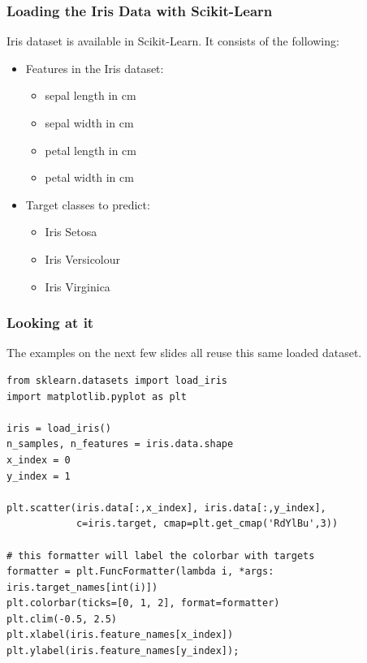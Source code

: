%
\begin{frame}[fragile]\frametitle{Loading the Iris Data with Scikit-Learn}
Iris dataset is available in Scikit-Learn.
It consists of the following:
\begin{itemize}
\item Features in the Iris dataset:
	\begin{itemize}
	\item sepal length in cm
	\item     sepal width in cm
	\item     petal length in cm
	\item     petal width in cm
	\end{itemize}
\item Target classes to predict:
	\begin{itemize}
	\item Iris Setosa
	\item     Iris Versicolour
	\item     Iris Virginica
	\end{itemize}
\end{itemize}
\end{frame}
%
\begin{frame}[fragile]\frametitle{Looking at it}
The examples on the next few slides all reuse this same loaded dataset.
\begin{lstlisting}
from sklearn.datasets import load_iris
import matplotlib.pyplot as plt

iris = load_iris()
n_samples, n_features = iris.data.shape
x_index = 0
y_index = 1

plt.scatter(iris.data[:,x_index], iris.data[:,y_index],
            c=iris.target, cmap=plt.get_cmap('RdYlBu',3))

# this formatter will label the colorbar with targets
formatter = plt.FuncFormatter(lambda i, *args: iris.target_names[int(i)])
plt.colorbar(ticks=[0, 1, 2], format=formatter)
plt.clim(-0.5, 2.5)
plt.xlabel(iris.feature_names[x_index])
plt.ylabel(iris.feature_names[y_index]);
\end{lstlisting}
\end{frame}

